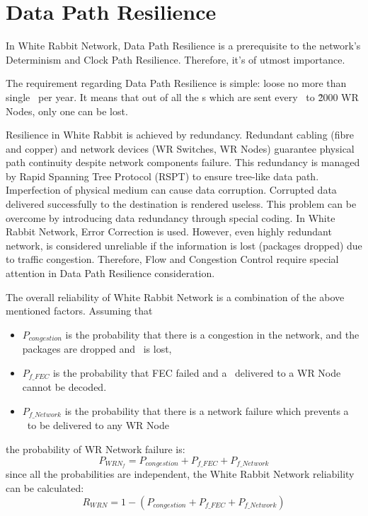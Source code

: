 \chapter{Data Path Resilience} 

In White Rabbit Network, Data Path Resilience is a prerequisite to the network's
Determinism and Clock Path Resilience. Therefore, it's of utmost importance. 

The requirement regarding Data Path Resilience is simple: loose no more than
single \ControlMessage\ per year. It means that out of all the \ControlMessage
s which are sent every \GranularityWindow\ to \~2000 WR Nodes, only one can be
lost. 


Resilience in White Rabbit is achieved by redundancy. Redundant cabling (fibre
and copper) and network devices (WR Switches, WR Nodes) guarantee physical path
continuity despite network components failure. This redundancy is managed by
Rapid Spanning Tree Protocol (RSPT) to ensure tree-like data path.
Imperfection of physical medium can cause data corruption. Corrupted data
delivered successfully to the destination is rendered useless. This problem can
be overcome by introducing data redundancy through special coding. In White
Rabbit Network, Error Correction is used. However, even highly
redundant network, is considered unreliable if the information is lost (packages
dropped) due to traffic congestion. Therefore, Flow and Congestion Control
require special attention in Data Path Resilience consideration. 

The overall reliability of White Rabbit Network is a combination of the above
mentioned factors. Assuming that 

\begin{itemize}
        \item $P_{congestion}$ is the probability that there is a congestion in
	      the network, and the packages are dropped and \ControlMessage\ is lost,
        \item $P_{f\_FEC}$ is the probability that FEC failed and a
	      \ControlMessage\ delivered to a WR Node cannot be decoded.
        \item $P_{f\_Network}$ is the probability that there is a network
	      failure which prevents a \ControlMessage\ to be delivered to any
	      WR Node
\end{itemize}
 
the probability of WR Network failure is:
\begin{equation}
  \label{equation:WRreliability}
     P_{WRN_f} =  P_{congestion} + P_{f\_FEC} + P_{f\_Network}
\end{equation}
since all the probabilities are independent, the White Rabbit Network
reliability can be calculated:
\begin{equation}
   \label{equation:WRreliability}
      R_{WRN} = 1 - (P_{congestion} + P_{f\_FEC} + P_{f\_Network})
\end{equation}

